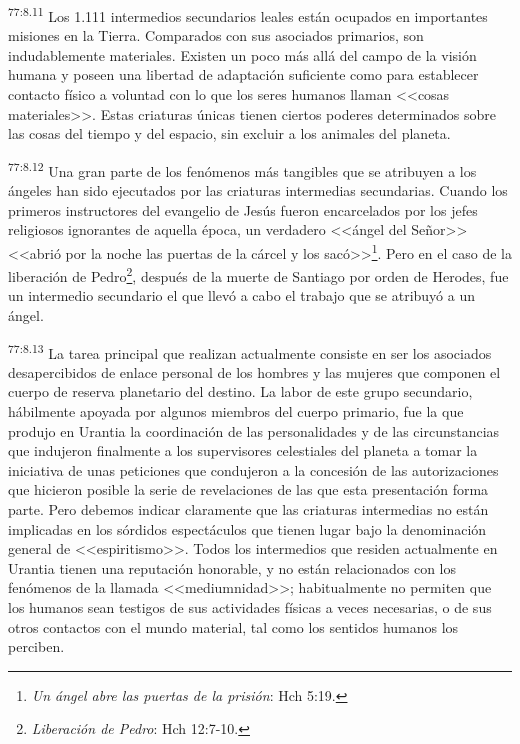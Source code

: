\par
\textsuperscript{77:8.11} Los 1.111 intermedios secundarios leales están ocupados en importantes misiones en la Tierra. Comparados con sus asociados primarios, son indudablemente materiales. Existen un poco más allá del campo de la visión humana y poseen una libertad de adaptación suficiente como para establecer contacto físico a voluntad con lo que los seres humanos llaman <<cosas materiales>>. Estas criaturas únicas tienen ciertos poderes determinados sobre las cosas del tiempo y del espacio, sin excluir a los animales del planeta.

\par
\textsuperscript{77:8.12} Una gran parte de los fenómenos más tangibles que se atribuyen a los ángeles han sido ejecutados por las criaturas intermedias secundarias. Cuando los primeros instructores del evangelio de Jesús fueron encarcelados por los jefes religiosos ignorantes de aquella época, un verdadero <<ángel del Señor>> <<abrió por la noche las puertas de la cárcel y los sacó>>\footnote{\textit{Un ángel abre las puertas de la prisión}: Hch 5:19.}. Pero en el caso de la liberación de Pedro\footnote{\textit{Liberación de Pedro}: Hch 12:7-10.}, después de la muerte de Santiago por orden de Herodes, fue un intermedio secundario el que llevó a cabo el trabajo que se atribuyó a un ángel.

\par
\textsuperscript{77:8.13} La tarea principal que realizan actualmente consiste en ser los asociados desapercibidos de enlace personal de los hombres y las mujeres que componen el cuerpo de reserva planetario del destino. La labor de este grupo secundario, hábilmente apoyada por algunos miembros del cuerpo primario, fue la que produjo en Urantia la coordinación de las personalidades y de las circunstancias que indujeron finalmente a los supervisores celestiales del planeta a tomar la iniciativa de unas peticiones que condujeron a la concesión de las autorizaciones que hicieron posible la serie de revelaciones de las que esta presentación forma parte. Pero debemos indicar claramente que las criaturas intermedias no están implicadas en los sórdidos espectáculos que tienen lugar bajo la denominación general de <<espiritismo>>. Todos los intermedios que residen actualmente en Urantia tienen una reputación honorable, y no están relacionados con los fenómenos de la llamada <<mediumnidad>>; habitualmente no permiten que los humanos sean testigos de sus actividades físicas a veces necesarias, o de sus otros contactos con el mundo material, tal como los sentidos humanos los perciben.

